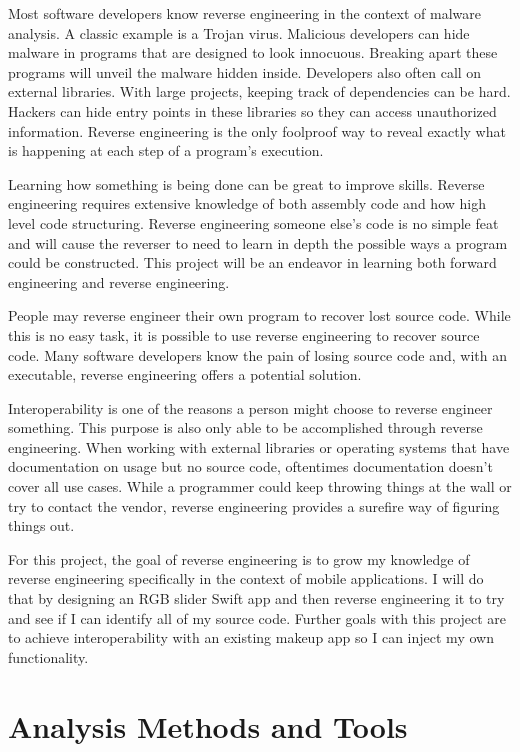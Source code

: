 \documentclass[12pt]{article}
\begin{document}
 Most software developers know reverse engineering in the context of malware analysis. A classic example is a Trojan virus. Malicious developers can hide malware in programs that are designed to look innocuous. Breaking apart these programs will unveil the malware hidden inside. Developers also often call on external libraries. With large projects, keeping track of dependencies can be hard. Hackers can hide entry points in these libraries so they can access unauthorized information. Reverse engineering is the only foolproof way to reveal exactly what is happening at each step of a program’s execution.

Learning how something is being done can be great to improve skills. Reverse engineering requires extensive knowledge of both assembly code and how high level code structuring. Reverse engineering someone else's code is no simple feat and will cause the reverser to need to learn in depth the possible ways a program could be constructed. This project will be an endeavor in learning both forward engineering and reverse engineering.  

People may reverse engineer their own program to recover lost source code. While this is no easy task, it is possible to use reverse engineering to recover source code. Many software developers know the pain of losing source code and, with an executable, reverse engineering offers a potential solution.

Interoperability is one of the reasons a person might choose to reverse engineer something. This purpose is also only able to be accomplished through reverse engineering. When working with external libraries or operating systems that have documentation on usage but no source code, oftentimes documentation doesn’t cover all use cases. While a programmer could keep throwing things at the wall or try to contact the vendor, reverse engineering provides a surefire way of figuring things out.

For this project, the goal of reverse engineering is to grow my knowledge of reverse engineering specifically in the context of mobile applications. I will do that by designing an RGB slider Swift app and then reverse engineering it to try and see if I can identify all of my source code. Further goals with this project are to achieve interoperability with an existing makeup app so I can inject my own functionality.

\section{Analysis Methods and Tools}
\end{document}
